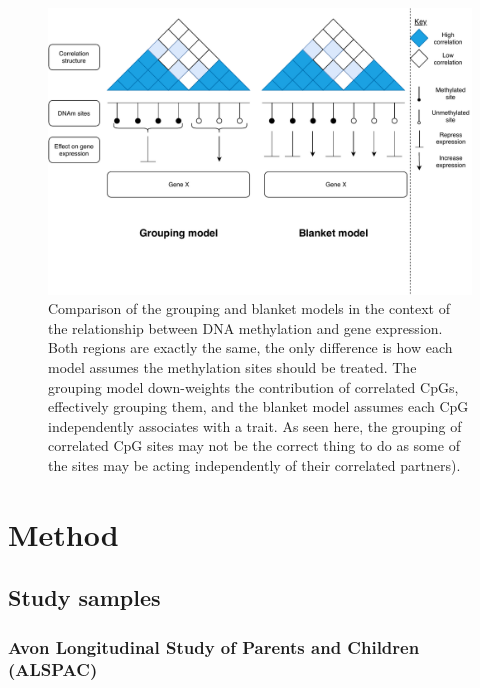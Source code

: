 \documentclass[11pt,oneside]{bristolthesis}
\begin{document}
\begin{figure}

{\centering \includegraphics[width=1\linewidth]{figure/05-h2ewas/m2_model_comparison} 

}

\caption{Comparison of the grouping and blanket models in the context of the relationship between DNA methylation and gene expression. Both regions are exactly the same, the only difference is how each model assumes the methylation sites should be treated. The grouping model down-weights the contribution of correlated CpGs, effectively grouping them, and the blanket model assumes each CpG independently associates with a trait. As seen here, the grouping of correlated CpG sites may not be the correct thing to do as some of the sites may be acting independently of their correlated partners).}\label{fig:h2ewas-model-comp}
\end{figure}
\hypertarget{method-05}{%
\section{Method}\label{method-05}}

\hypertarget{study-samples-05}{%
\subsection{Study samples}\label{study-samples-05}}

\hypertarget{methods-alspac-05}{%
\subsubsection{Avon Longitudinal Study of Parents and Children (ALSPAC)}\label{methods-alspac-05}}
\end{document}
